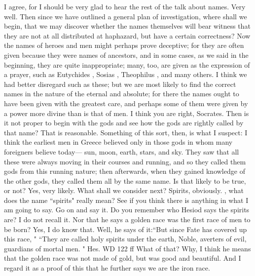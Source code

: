\hermogenesspeaks
I agree, for I should be very glad to hear the rest of the talk about names.
\socratesspeaks
Very well. Then since we have outlined a general plan of investigation, where shall we begin, that we may discover whether the names themselves will bear witness that they are not at all distributed at haphazard, but have a certain correctness?  Now the names of heroes and men might perhaps prove deceptive; for they are often given because they were names of ancestors, and in some cases, as we said in the beginning, they are quite inappropriate; many, too, are given as the expression of a prayer, such as Eutychides , Sosias , Theophilus , and many others. I think we had better disregard such as these; but we are most likely to find the correct names in the nature of the eternal and absolute; for there the names ought to have been given with the greatest care,  and perhaps some of them were given by a power more divine than is that of men.
\hermogenesspeaks
I think you are right, Socrates.
\socratesspeaks
Then is it not proper to begin with the gods and see how the gods are rightly called by that name?
\hermogenesspeaks
That is reasonable.
\socratesspeaks
Something of this sort, then, is what I suspect: I think the earliest men in Greece believed only in those gods in whom many foreigners believe today—  sun, moon, earth, stars, and sky. They saw that all these were always moving in their courses and running, and so they called them gods  from this running  nature; then afterwards, when they gained knowledge of the other gods, they called them all by the same name. Is that likely to be true, or not?
\hermogenesspeaks
Yes, very likely.
\socratesspeaks
What shall we consider next? 
\hermogenesspeaks
Spirits, obviously.
\socratesspeaks
\hermogenesspeaks, what does the name ``spirits" really mean? See if you think there is anything in what I am going to say.
\hermogenesspeaks
Go on and say it.
\socratesspeaks
Do you remember who Hesiod says the spirits are?
\hermogenesspeaks
I do not recall it.
\socratesspeaks
Nor that he says a golden race was the first race of men to be born?
\hermogenesspeaks
Yes, I do know that.
\socratesspeaks
Well, he says of it:``But since Fate has covered up this race,
" 
``They are called holy spirits under the earth,
Noble, averters of evil, guardians of mortal men.
"
Hes. WD 122 ff
\hermogenesspeaks
What of that?
\socratesspeaks
Why, I think he means that the golden race was not made of gold, but was good and beautiful. And I regard it as a proof of this that he further says we are the iron race.
